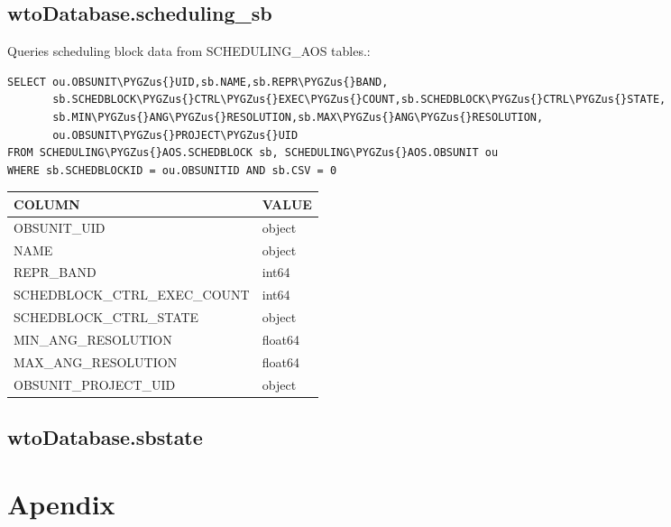 \documentclass[a4paper,10pt,english]{sphinxmanual}
\def\PYGZus{\char`\_}
\begin{document}
\section{wtoDatabase.scheduling\_sb}
\label{wtodata:wtodatabase-scheduling-sb}
Queries scheduling block data from SCHEDULING\_AOS tables.:

\begin{Verbatim}[commandchars=\\\{\}]
SELECT ou.OBSUNIT\PYGZus{}UID,sb.NAME,sb.REPR\PYGZus{}BAND,
       sb.SCHEDBLOCK\PYGZus{}CTRL\PYGZus{}EXEC\PYGZus{}COUNT,sb.SCHEDBLOCK\PYGZus{}CTRL\PYGZus{}STATE,
       sb.MIN\PYGZus{}ANG\PYGZus{}RESOLUTION,sb.MAX\PYGZus{}ANG\PYGZus{}RESOLUTION,
       ou.OBSUNIT\PYGZus{}PROJECT\PYGZus{}UID
FROM SCHEDULING\PYGZus{}AOS.SCHEDBLOCK sb, SCHEDULING\PYGZus{}AOS.OBSUNIT ou
WHERE sb.SCHEDBLOCKID = ou.OBSUNITID AND sb.CSV = 0
\end{Verbatim}

\begin{tabulary}{\linewidth}{|L|L|}
\hline
\textsf{\relax 
COLUMN
} & \textsf{\relax 
VALUE
}\\
\hline
OBSUNIT\_UID
 & 
object
\\

NAME
 & 
object
\\

REPR\_BAND
 & 
int64
\\

SCHEDBLOCK\_CTRL\_EXEC\_COUNT
 & 
int64
\\

SCHEDBLOCK\_CTRL\_STATE
 & 
object
\\

MIN\_ANG\_RESOLUTION
 & 
float64
\\

MAX\_ANG\_RESOLUTION
 & 
float64
\\

OBSUNIT\_PROJECT\_UID
 & 
object
\\
\hline\end{tabulary}



\section{wtoDatabase.sbstate}
\label{wtodata:wtodatabase-sbstate}

\chapter{Apendix}
\label{apendix:apendix}\label{apendix::doc}
\end{document}
